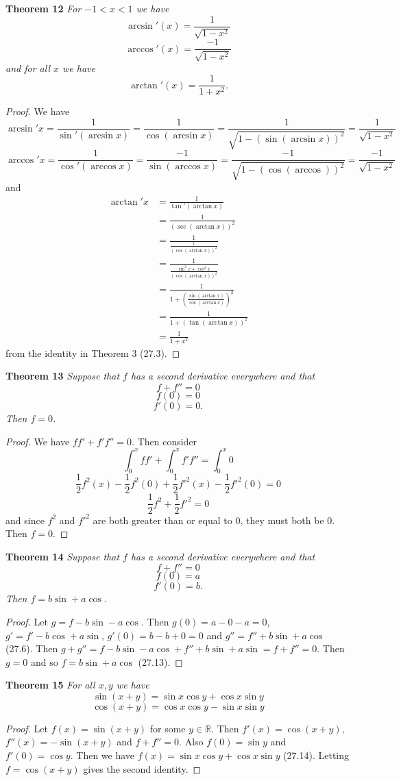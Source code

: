 \documentclass{article}
\begin{document}
\begin{flushleft}
\textbf{Theorem 12}
\textsl{For $-1 < x < 1$ we have
\[
\arcsin' (x) = \frac{1}{\sqrt{1-x^2}}
\]
\[
\arccos' (x) = \frac{-1}{\sqrt{1-x^2}}
\]
and for all $x$ we have
\[
\arctan' (x) = \frac{1}{1+x^2}.
\]}
\begin{proof}
We have
\[
\arcsin' x = \frac{1}{\sin' (\arcsin x)} = \frac{1}{\cos (\arcsin x)} = \frac{1}{\sqrt{1 - (\sin (\arcsin x))^2}} = \frac{1}{\sqrt{1-x^2}}
\]
\[
\arccos' x = \frac{1}{\cos' (\arccos x)} = \frac{-1}{\sin (\arccos x)} = \frac{-1}{\sqrt{1 - (\cos (\arccos))^2}} = \frac{-1}{\sqrt{1-x^2}}
\]
and
\begin{align*}
\arctan' x &= \frac{1}{\tan' (\arctan x)} \\
		 &= \frac{1}{(\sec (\arctan x))^2} \\
		 &= \frac{1}{\frac{1}{(\cos (\arctan x))^2}} \\
		 &= \frac{1}{\frac{\sin^2 x + \cos^2 x}{(\cos (\arctan x))^2}} \\
		 &= \frac{1}{1 + \left ( \frac{\sin (\arctan x)}{\cos (\arctan x)} \right )^2} \\
		 &= \frac{1}{1 + (\tan (\arctan x))^2} \\
		 &= \frac{1}{1+x^2}
\end{align*}
from the identity in Theorem 3 (27.3).
\end{proof}

\textbf{Theorem 13}
\textsl{Suppose that $f$ has a second derivative everywhere and that
\[
f + f'' = 0
\]
\[
f(0) = 0
\]
\[
f'(0) = 0.
\]
Then $f = 0$.}
\begin{proof}
We have $ff' + f'f'' = 0$. Then consider
\[
\int_0^x ff' + \int_0^x f'f'' = \int_0^x 0
\]
\[
\frac{1}{2}f^2(x) - \frac{1}{2}f^2(0) + \frac{1}{2}f'^2(x) - \frac{1}{2}f'^2(0) = 0
\]
\[
\frac{1}{2}f^2 + \frac{1}{2}f'^2 = 0
\]
and since $f^2$ and $f'^2$ are both greater than or equal to $0$, they must both be $0$. Then $f=0$.
\end{proof}

\textbf{Theorem 14}
\textsl{Suppose that $f$ has a second derivative everywhere and that
\[
f + f'' = 0
\]
\[
f(0) = a
\]
\[
f'(0) = b.
\]
Then $f = b \sin + a \cos$.}
\begin{proof}
Let $g = f - b \sin - a \cos$. Then $g(0) = a - 0 - a = 0$, $g' = f' - b \cos + a \sin$, $g'(0) = b - b + 0 = 0$ and $g'' = f'' + b \sin + a \cos $ (27.6). Then $g+g'' = f - b \sin - a \cos + f'' + b \sin + a \sin = f+f'' = 0$. Then $g = 0$ and so $f = b \sin + a \cos$ (27.13).
\end{proof}

\textbf{Theorem 15}
\textsl{For all $x,y$ we have
\[
\sin (x+y) = \sin x \cos y + \cos x \sin y
\]
\[
\cos (x+y) = \cos x \cos y - \sin x \sin y
\]}
\begin{proof}
Let $f(x) = \sin (x+y)$ for some $y \in \mathbb{R}$. Then $f'(x) = \cos(x+y)$, $f''(x) = -\sin(x+y)$ and $f + f'' = 0$. Also $f(0) = \sin y$ and $f'(0) = \cos y$. Then we have $f (x) = \sin x \cos y + \cos x \sin y$ (27.14). Letting $f = \cos (x+y)$ gives the second identity.
\end{proof}

\end{flushleft}
\end{document}
